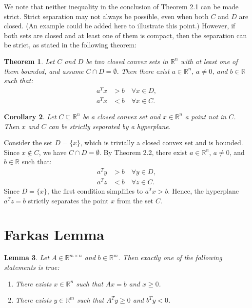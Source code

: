 \documentclass[11pt]{amsart} %
\newtheorem{thm}{Theorem}[section]
\newtheorem{lem}[thm]{Lemma}
\newtheorem{cor}[thm]{Corollary}
\theoremstyle{definition}
\begin{document}
We note that neither inequality in the conclusion of Theorem 2.1 can be made strict. Strict separation may not always be possible, even when both \( C \) and \( D \) are closed. (An example could be added here to illustrate this point.) However, if both sets are closed and at least one of them is compact, then the separation can be strict, as stated in the following theorem:\\

\begin{thm}
    Let \( C \) and \( D \) be two closed convex sets in \(\mathbb{R}^n\) with at least one of them bounded, and assume \( C \cap D = \emptyset \). Then there exist \( a \in \mathbb{R}^n \), \( a \neq 0 \), and \( b \in \mathbb{R} \) such that:
\begin{align*}
    a^T x &> b \quad \forall x \in D, \\
    a^T x &< b \quad \forall x \in C.
\end{align*}
\end{thm}

\begin{cor}
    Let \( C \subseteq \mathbb{R}^n \) be a closed convex set and \( x \in \mathbb{R}^n \) a point not in \( C \). Then \( x \) and \( C \) can be strictly separated by a hyperplane.\\
\end{cor}

Consider the set \( D = \{x\} \), which is trivially a closed convex set and is bounded. Since \( x \notin C \), we have \( C \cap D = \emptyset \). By Theorem 2.2, there exist \( a \in \mathbb{R}^n \), \( a \neq 0 \), and \( b \in \mathbb{R} \) such that:
\begin{align*}
    a^T y &> b \quad \forall y \in D, \\
    a^T z &< b \quad \forall z \in C.
\end{align*}
Since \( D = \{x\} \), the first condition simplifies to \( a^T x > b \). Hence, the hyperplane \( a^T z = b \) strictly separates the point \( x \) from the set \( C \).\\

\section{Farkas Lemma}

\begin{lem}
    Let \( A \in \mathbb{R}^{m \times n} \) and \( b \in \mathbb{R}^m \). Then exactly one of the following statements is true:
\begin{enumerate}
    \item There exists \( x \in \mathbb{R}^n \) such that \( Ax = b \) and \( x \geq 0 \).
    \item There exists \( y \in \mathbb{R}^m \) such that \( A^T y \ge 0 \) and \( b^T y < 0 \).
\end{enumerate}
\end{lem}
\end{document}
